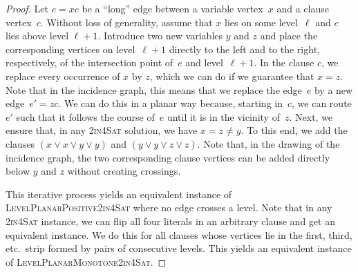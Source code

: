 \documentclass[runningheads]{llncs}
\begin{document}
\begin{proof}
    Let $e = xc$ be a ``long'' edge between a variable vertex~$x$ and a clause vertex~$c$.
    Without loss of generality, assume that $x$ lies
    on some level~$\ell$ and $c$ lies above level $\ell + 1$.
    Introduce two new variables $y$ and $z$
    and place the corresponding vertices on level~$\ell + 1$
    directly to the left and to the right, respectively, of the intersection point
    of~$e$ and level~$\ell + 1$.
    In the clause $c$, we replace every occurrence of $x$ by $z$,
    which we can do if we guarantee that $x = z$.
    Note that in the incidence graph,
    this means that we replace the edge~$e$ by a new edge~$e' = zc$.
    We can do this in a planar way because, starting in~$c$, we can route $e'$ such 
    that it follows the course of~$e$ until it is in the vicinity of~$z$.
    Next, we ensure that, in any \textsc{2in4Sat} solution,
    we have $x = z \ne y$.
    To this end, we add the clauses $(x \lor x \lor y \lor y)$
    and $(y \lor y \lor z \lor z)$.
    Note that, in the drawing of the incidence graph,
    the two corresponding clause vertices can be added
    directly below $y$ and $z$ without creating crossings.
    
    This iterative process yields an equivalent instance
    of \textsc{LevelPlanarPositive2in4Sat} where no edge crosses a level.
    Note that in any \textsc{2in4Sat} instance, we can flip
    all four literals in an arbitrary clause and get an equivalent instance.
    We do this for all clauses whose vertices lie in the
    first, third, etc.\ strip formed by pairs of consecutive levels.
    This yields an equivalent instance of \textsc{LevelPlanarMonotone2in4Sat}.
\end{proof}

\NPh*
\label{th:nph*}
\end{document}
